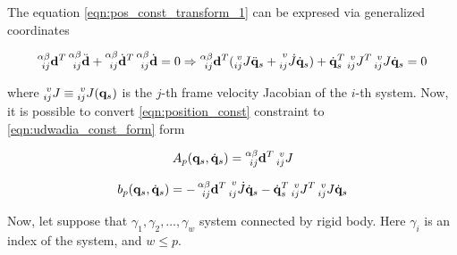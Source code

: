 The equation \ref{eqn:pos_const_transform_1} can be expresed via generalized coordinates

\begin{equation}
    \label{eqn:pos_const_transform_2}
    \prescript{\alpha \beta}{ij}{\mathbf{d}}^T 
    \prescript{\alpha \beta}{ij}{\ddot{\mathbf{d}}} + 
    \prescript{\alpha \beta}{ij}{\dot{\mathbf{d}}}^T 
    \prescript{\alpha \beta}{ij}{\dot{\mathbf{d}}} = 0
    \Rightarrow
    \prescript{\alpha \beta}{ij}{\mathbf{d}}^T 
    (
        \prescript{v}{ij}{J} \ddot{\mathbf{q}}_s + 
        \prescript{v}{ij}{\dot{J}} \dot{\mathbf{q}}_s
    ) + 
    \dot{\mathbf{q}}_s^T \prescript{v}{ij}{J}^T 
    \prescript{v}{ij}{J} \dot{\mathbf{q}}_s = 0
\end{equation}

where $\prescript{v}{ij}{J} \equiv \prescript{v}{ij}{J}(\mathbf{q}_s)$ is the 
$j$-th frame velocity Jacobian of the $i$-th system. Now, it is possible to 
convert \ref{eqn:position_const} constraint to \ref{eqn:udwadia_const_form} form

\begin{equation}
    \label{eqn:pos_const_a_matrix}
    A_p(\mathbf{q}_s, \dot{\mathbf{q}}_s) = 
    \prescript{\alpha \beta}{ij}{\mathbf{d}}^T \prescript{v}{ij}{J}
\end{equation}

\begin{equation}
    \label{eqn:pos_const_b_vector}
    b_p(\mathbf{q}_s, \dot{\mathbf{q}}_s) = 
    - \prescript{\alpha \beta}{ij}{\mathbf{d}}^T 
    \prescript{v}{ij}{\dot{J}} \dot{\mathbf{q}}_s
    - \dot{\mathbf{q}}_s^T \prescript{v}{ij}{J}^T
    \prescript{v}{ij}{J} \dot{\mathbf{q}}_s
\end{equation}

Now, let suppose that $\gamma_1, \gamma_2, \dots, \gamma_w$ system connected by rigid 
body. Here $\gamma_i$ is an index of the system, and $w \leq p$. 
